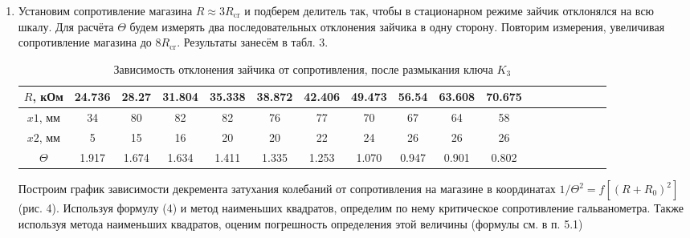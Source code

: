 \documentclass[a4paper]{article}
\begin{document}
\begin{enumerate}
    \item Установим сопротивление магазина $R \approx 3R_\text{cr}$ и подберем делитель так, чтобы в стационарном режиме зайчик отклонялся на всю шкалу. Для расчёта $\Theta$ будем измерять два последовательных отклонения зайчика в одну сторону. Повторим измерения, увеличивая сопротивление магазина до $8R_\text{cr}$. Результаты занесём в табл. 3.

          \begin{table}[H]
              \centering
              \begin{center}
                  \caption{Зависимость отклонения зайчика от сопротивления, после размыкания ключа $K_3$}
              \end{center}
              \vspace{0.1cm}
              \label{tab:my_label}
              \begin{tabular}{ |c|c|c|c|c|c|c|c|c|c|c|c|c|c|c|c|c|c|}
                  \hline
                  $R$, кОм & 24.736 & 28.27 & 31.804 & 35.338 & 38.872 & 42.406 & 49.473 & 56.54 & 63.608 & 70.675 \\
                  \hline
                  $x1$, мм & 34     & 80    & 82     & 82     & 76     & 77     & 70     & 67    & 64     & 58     \\
                  \hline
                  $x2$, мм & 5      & 15    & 16     & 20     & 20     & 22     & 24     & 26    & 26     & 26     \\
                  \hline
                  $\Theta$ & 1.917  & 1.674 & 1.634  & 1.411  & 1.335  & 1.253  & 1.070  & 0.947 & 0.901  & 0.802  \\
                  \hline
              \end{tabular}
          \end{table}

          Построим график зависимости декремента затухания колебаний от сопротивления на магазине в координатах $1/\Theta^2 = f[(R+R_0)^2]$ (рис. 4). Используя формулу (4) и метод наименьших квадратов, определим по нему критическое сопротивление гальванометра. Также используя метода наименьших квадратов, оценим погрешность определения этой величины (формулы см. в п. 5.1)


\end{enumerate}
\end{document}
